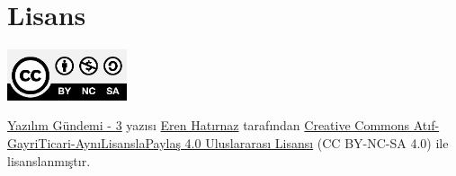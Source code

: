 \documentclass[11pt]{article}
\begin{document}
\section{Lisans}
\label{sec:orga82cfe9}
\begin{center}
\begin{center}
\includegraphics[height=1.5cm]{../../../img/CC_BY-NC-SA_4.0.png}
\end{center}

\href{yazilim-gundemi-03.pdf}{Yazılım Gündemi - 3} yazısı \href{https://erenhatirnaz.github.io}{Eren Hatırnaz} tarafından \href{http://creativecommons.org/licenses/by-nc-sa/4.0/}{Creative Commons
Atıf-GayriTicari-AynıLisanslaPaylaş 4.0 Uluslararası Lisansı} (CC BY-NC-SA 4.0)
ile lisanslanmıştır.
\end{center}
\end{document}
